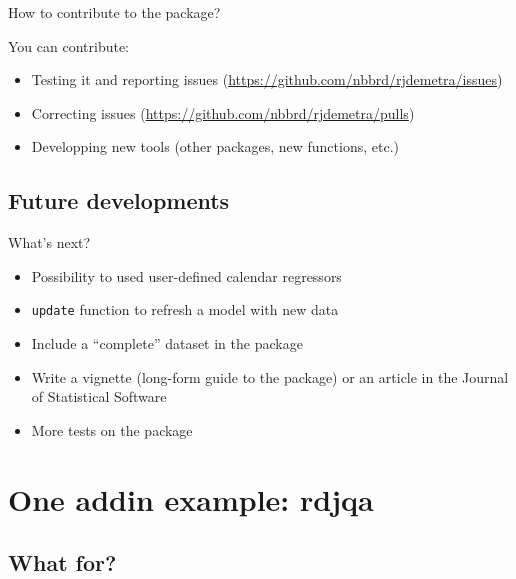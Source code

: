 \documentclass[10pt,xcolor=table,color={dvipsnames,usenames},ignorenonframetext,usepdftitle=false,french]{beamer}
\begin{document}
\begin{frame}{How to contribute to the package?}

You can contribute:

\begin{itemize}
\item
  Testing it and reporting issues
  (\url{https://github.com/nbbrd/rjdemetra/issues})
\item
  Correcting issues (\url{https://github.com/nbbrd/rjdemetra/pulls})
\item
  Developping new tools (other packages, new functions, etc.)
\end{itemize}

\end{frame}

\subsection{Future developments}\label{future-developments}

\begin{frame}[fragile]{What's next? \bcpanchant}

\begin{itemize}
\item
  Possibility to used user-defined calendar regressors
\item
  \texttt{update} function to refresh a model with new data
\item
  Include a ``complete'' dataset in the package
\item
  Write a vignette (long-form guide to the package) or an article in the
  Journal of Statistical Software
\item
  More tests on the package
\end{itemize}

\end{frame}

\section{One addin example: rdjqa}\label{one-addin-example-rdjqa}

\subsection{What for?}\label{what-for}
\end{document}
